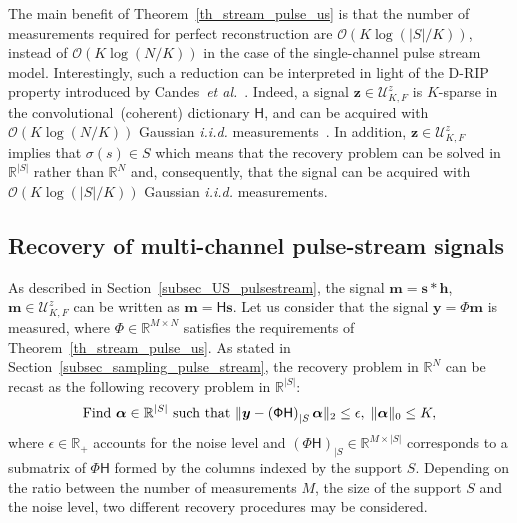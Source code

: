 \documentclass{article}
\newcommand{\etal}{\textit{et al.}}
\newcommand{\vect}[1]{\bm{#1}}
\newcommand{\mat}[1]{\mathsf{#1}}
\theoremstyle{definition}
\begin{document}
The main benefit of Theorem~\ref{th_stream_pulse_us} is that the number of measurements required for perfect reconstruction are $\mathcal{O}\left(K \log \left(|S|/K\right)\right)$, instead of $\mathcal{O}\left(K \log \left(N/K\right)\right)$ in the case of the single-channel pulse stream model.
Interestingly, such a reduction can be interpreted in light of the D-RIP property introduced by Candes~\etal{}~\cite{candes11}. 
Indeed, a signal $\vect{z} \in \mathcal{U}^z_{K,F}$ is $K$-sparse in the convolutional~(coherent) dictionary $\mat{H}$, and can be acquired with $\mathcal{O} \left(K \log \left(N / K\right)\right)$ Gaussian \textit{i.i.d.} measurements~\cite{candes11}. 
In addition, $\vect{z} \in \mathcal{U}^z_{K,F}$ implies that $\sigma \left(s\right) \in S$ which means that the recovery problem can be solved in $\mathbb{R}^{|S|}$ rather than $\mathbb{R}^N$ and, consequently, that the signal can be acquired with $\mathcal{O} \left(K \log \left(|S| / K\right)\right)$ Gaussian \textit{i.i.d.} measurements. 

\subsection{Recovery of multi-channel pulse-stream signals}
\label{subsec_recovery_pulse_stream}
As described in Section~\ref{subsec_US_pulsestream}, the signal $\vect{m} = \vect{s} \ast \vect{h}$, $\vect{m} \in \mathcal{U}^z_{K,F}$ can be written as $\vect{m} = \mat{H} \vect{s}$. 
Let us consider that the signal $\vect{y} = \mat{\Phi} \vect{m}$ is measured, where $\mat{\Phi} \in \mathbb{R}^{M \times N}$ satisfies the requirements of Theorem~\ref{th_stream_pulse_us}. 
As stated in Section~\ref{subsec_sampling_pulse_stream}, the recovery problem in $\mathbb{R}^N$ can be recast as the following recovery problem in $\mathbb{R}^{|S|}$:
\begin{equation}
\label{eq_problem_support}
\textnormal{Find } \vect{\alpha} \in \mathbb{R}^{|S|} \textnormal{ such that } \| \vect{y} - \left(\mat{\Phi H}\right)_{|S}\vect{\alpha}\|_2 \leq \epsilon, \; \| \vect{\alpha} \|_0 \leq K, 
\end{equation}
where $\epsilon \in \mathbb{R}_{+}$ accounts for the noise level and $\left(\mat{\Phi H}\right)_{|S} \in \mathbb{R}^{M \times |S|}$ corresponds to a submatrix of $\mat{\Phi H}$ formed by the columns indexed by the support $S$. 
Depending on the ratio between the number of measurements $M$, the size of the support $S$ and the noise level, two different recovery procedures may be considered.
\end{document}
